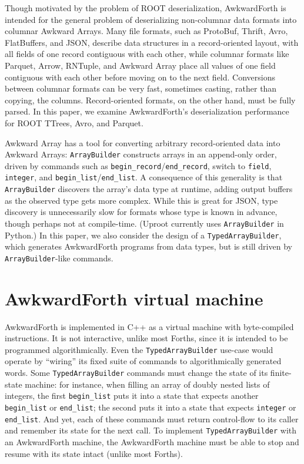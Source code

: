 \documentclass{webofc}
\begin{document}
Though motivated by the problem of ROOT deserialization, AwkwardForth is intended for the general problem of deserializing non-columnar data formats into columnar Awkward Arrays. Many file formats, such as ProtoBuf, Thrift, Avro, FlatBuffers, and JSON, describe data structures in a record-oriented layout, with all fields of one record contiguous with each other, while columnar formats like Parquet, Arrow, RNTuple, and Awkward Array place all values of one field contiguous with each other before moving on to the next field. Conversions between columnar formats can be very fast, sometimes casting, rather than copying, the columns. Record-oriented formats, on the other hand, must be fully parsed. In this paper, we examine AwkwardForth's deserialization performance for ROOT TTrees, Avro, and Parquet.

Awkward Array has a tool for converting arbitrary record-oriented data into Awkward Arrays: \texttt{ArrayBuilder} constructs arrays in an append-only order, driven by commands such as \texttt{begin_record}/\texttt{end_record}, switch to \texttt{field}, \texttt{integer}, and \texttt{begin_list}/\texttt{end_list}. A consequence of this generality is that \texttt{ArrayBuilder} discovers the array's data type at runtime, adding output buffers as the observed type gets more complex. While this is great for JSON, type discovery is unnecessarily slow for formats whose type is known in advance, though perhaps not at compile-time. (Uproot currently uses \texttt{ArrayBuilder} in Python.) In this paper, we also consider the design of a \texttt{TypedArrayBuilder}, which generates AwkwardForth programs from data types, but is still driven by \texttt{ArrayBuilder}-like commands.

\section{AwkwardForth virtual machine}

AwkwardForth is implemented in C++ as a virtual machine with byte-compiled instructions. It is not interactive, unlike most Forths, since it is intended to be programmed algorithmically. Even the \texttt{TypedArrayBuilder} use-case would operate by ``wiring'' its fixed suite of commands to algorithmically generated words. Some \texttt{TypedArrayBuilder} commands must change the state of its finite-state machine: for instance, when filling an array of doubly nested lists of integers, the first \texttt{begin_list} puts it into a state that expects another \texttt{begin_list} or \texttt{end_list}; the second puts it into a state that expects \texttt{integer} or \texttt{end_list}. And yet, each of these commands must return control-flow to its caller and remember its state for the next call. To implement \texttt{TypedArrayBuilder} with an AwkwardForth machine, the AwkwardForth machine must be able to stop and resume with its state intact (unlike most Forths).
\end{document}
